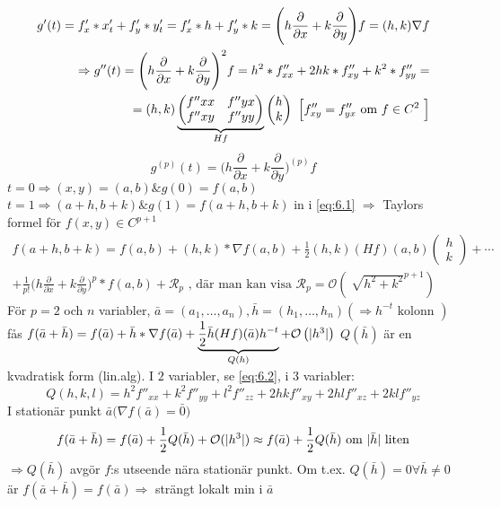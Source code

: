 \documentclass[a4paper]{article}
\DeclarePairedDelimiter \abs{\lvert}{\rvert}
\let\oldsqrt\sqrt
\renewcommand*{\sqrt}[2][\ ]{\oldsqrt[#1]{#2} }
\begin{document}
\[
\begin{split}
g'(t) = f'_x * x'_t + f'_y * y'_t = f'_x * h + f'_y * k = \Bigg( h\frac{\partial}{\partial x} + k\frac{\partial}{\partial y} \Bigg)f = (h,k) \nabla f \\
\Rightarrow g''(t) = \Bigg( h\frac{\partial}{\partial x} + k\frac{\partial}{\partial y} \Bigg)^2 f = h^2*f''_{xx} + 2hk*f''_{xy} + k^2*f''_{yy} = \\
= (h,k)
\underbrace{\begin{pmatrix}
	f''{xx} & f''{yx} \\
	f''{xy} & f''{yy} \\
\end{pmatrix}}_{Hf}
\begin{pmatrix}
	h \\
	k
\end{pmatrix}
\text{ \Big[$f''_{xy} = f''_{yx}$ om $f \in C^2$ \Big]}
\end{split}
\]
\begin{equation} \label{eq:6.2}
g^{(p)}(t) = \Bigg( h\frac{\partial}{\partial x} + k\frac{\partial}{\partial y} \Bigg)^{(p)} f
\end{equation}
$t = 0 \Rightarrow (x,y) = (a,b) \& g(0) = f(a,b)$ \newline
$t = 1 \Rightarrow (a+h,b+k) \& g(1) = f(a+h,b+k)$ in i \vref{eq:6.1}
$\Rightarrow$ Taylors formel för $f(x,y) \in C^{p+1}$
\[
\begin{split}
	f(a+h,b+k) = f(a,b) + (h,k) * \nabla f(a,b) + \frac{1}{2}(h,k)(Hf)(a,b)
	\begin{pmatrix}
		h \\
		k
	\end{pmatrix}
	+ \cdots \\
	+ \frac{1}{p!}\Big(h\frac{\partial}{\partial x} + k\frac{\partial}{\partial y})^p * f(a,b) + \mathcal{R}_p \text{ , där man kan visa } \mathcal{R}_p = \mathcal{O}\left(\sqrt{h^2 + k^2}^{p+1}\right)
\end{split}
\]
För $p=2$ och $n$ variabler, $\bar{a} = (a_1, \ldots ,a_n) , \bar{h} = (h_1, \ldots ,h_n) \left(\Rightarrow h^{-t} \text{ kolonn } \right)$ fås 
$f(\bar{a}+\bar{h}) = f(\bar{a}) + \bar{h} * \nabla f(\bar{a}) + \underbrace{\frac{1}{2}\bar{h}(Hf)(\bar{a})h^{-t}}_{Q(h)} + \mathcal{O}\left(\abs{h^3}\right)$
\newpage
$Q(\bar{h})$ är en kvadratisk form (lin.alg). I $2$ variabler, se \eqref{eq:6.2}, i $3$ variabler:
$$
	Q(h,k,l) = h^2f''_{xx} + k^2f''_{yy} + l^2f''_{zz} + 2hkf''_{xy} + 2hlf''_{xz} + 2klf''_{yz}
$$
I stationär punkt $\bar{a} \Big(\nabla f(\bar{a}) = \bar{0}\Big)$
$$
	f(\bar{a}+\bar{h}) = f(\bar{a}) + \frac{1}{2}Q(\bar{h}) + \mathcal{O}(\abs{h^3}) \approx f(\bar{a}) + \frac{1}{2}Q(\bar{h}) \text{ om } \abs{\bar{h}} \text{ liten}
$$
$\Rightarrow Q(\bar{h})$ avgör $f$:s utseende nära stationär punkt. \newline Om t.ex. $Q(\bar{h}) = 0 \forall \bar{h} \neq 0$ är $f(\bar{a}+\bar{h}) = f(\bar{a}) \Rightarrow$ strängt lokalt min i $\bar{a}$
\end{document}
